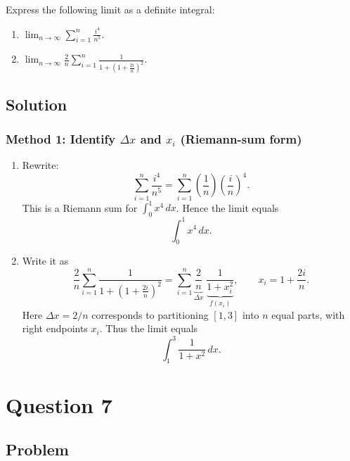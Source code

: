 \documentclass[12pt]{article}
\begin{document}
Express the following limit as a definite integral:
\begin{enumerate}[label=(\roman*)]
\item \(\displaystyle \lim_{n\to\infty}\sum_{i=1}^{n}\frac{i^4}{n^5}.\)
\item \(\displaystyle \lim_{n\to\infty}\frac{2}{n}\sum_{i=1}^{n}\frac{1}{1+\left(1+\frac{2i}{n}\right)^2}.\)
\end{enumerate}

\subsection*{Solution}

\subsubsection*{Method 1: Identify \(\Delta x\) and \(x_i\) (Riemann-sum form)}

\begin{enumerate}[label=(\roman*)]
\item Rewrite:
\[
\sum_{i=1}^n \frac{i^4}{n^5} = \sum_{i=1}^n \left(\frac{1}{n}\right)\left(\frac{i}{n}\right)^4.
\]
This is a Riemann sum for \(\int_0^1 x^4\,dx\). Hence the limit equals
\[
\int_0^1 x^4\,dx.
\]

\item Write it as
\[
\frac{2}{n}\sum_{i=1}^{n}\frac{1}{1+\left(1+\frac{2i}{n}\right)^2}
=\sum_{i=1}^n \underbrace{\frac{2}{n}}_{\Delta x}\;
\underbrace{\frac{1}{1+x_i^2}}_{f(x_i)},
\qquad
x_i=1+\frac{2i}{n}.
\]
Here \(\Delta x=2/n\) corresponds to partitioning \([1,3]\) into \(n\) equal parts, with right endpoints \(x_i\). Thus the limit equals
\[
\int_{1}^{3}\frac{1}{1+x^2}\,dx.
\]
\end{enumerate}



\bigskip


\newpage

\section*{Question 7}

\subsection*{Problem}
\end{document}
